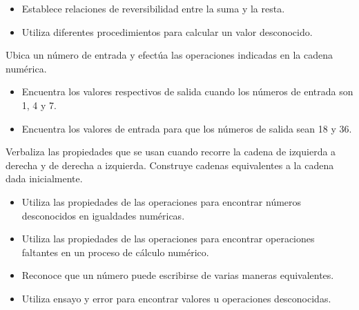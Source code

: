 
\evidencias

\begin{itemize}
  \item Establece relaciones de reversibilidad entre la suma y la resta.
  \item Utiliza diferentes procedimientos para calcular un valor desconocido.
\end{itemize}

\ejemplo

Ubica un número de entrada y efectúa las operaciones indicadas en la cadena numérica.


\begin{itemize}
  \item Encuentra los valores respectivos de salida cuando los números de entrada son 1, 4 y 7.
  \item Encuentra los valores de entrada para que los números de salida sean 18 y 36.
\end{itemize}


Verbaliza las propiedades que se usan cuando recorre la cadena de izquierda a derecha y de derecha a izquierda. Construye cadenas equivalentes a la cadena dada inicialmente.


\evidencias

\begin{itemize}
  \item Utiliza las propiedades de las operaciones para encontrar números desconocidos en igualdades numéricas.
  \item Utiliza las propiedades de las operaciones para encontrar operaciones faltantes en un proceso de cálculo numérico.
  \item Reconoce que un número puede escribirse de varias maneras equivalentes.
  \item Utiliza ensayo y error para encontrar valores u operaciones desconocidas.
\end{itemize}

